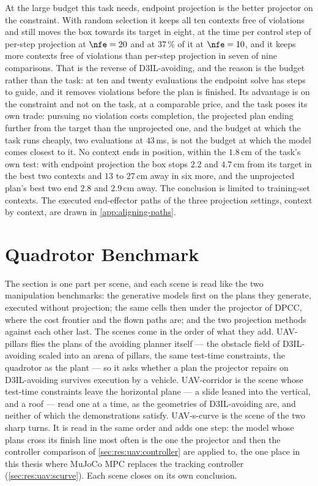 At the large budget this task needs, endpoint projection is the better projector on the constraint. With
random selection it keeps all ten contexts free of violations and still moves the box towards its target in
eight, at the time per control step of per-step projection at $\nfe=20$ and at $37\,\%$ of it at $\nfe=10$, and
it keeps more contexts free of violations than per-step projection in seven of nine comparisons. That is the reverse of D3IL-avoiding,
and the reason is the budget rather than the task: at ten and twenty evaluations the endpoint solve has steps
to guide, and it removes violations before the plan is finished. Its advantage is on the constraint and not on
the task, at a comparable price, and the task poses its own trade: pursuing no violation costs completion, the
projected plan ending further from the target than the unprojected one, and the budget at which the task runs
cheaply, two evaluations at $43$\,ms, is not the budget at which the model comes closest to it. No context ends
in position, within the $1.8$\,cm of the task's own test: with endpoint projection the box stops $2.2$ and
$4.7$\,cm from its target in the best two contexts and $13$ to $27$\,cm away in six more, and the unprojected plan's
best two end $2.8$ and $2.9$\,cm away. The conclusion is limited to training-set contexts. The executed end-effector paths of the three projection settings, context by
context, are drawn in \autoref{app:aligning-paths}.

\section{Quadrotor Benchmark}\label{sec:res:uav}

The section is one part per scene, and each scene is read like the two manipulation benchmarks: the
generative models first on the plans they generate, executed without projection; the same cells then under
the projector of \ac{DPCC}, where the cost frontier and the flown paths are; and the two projection methods
against each other last. The scenes come in the order of what they add. UAV-pillars flies the plans of the avoiding planner itself
--- the obstacle field of D3IL-avoiding scaled into an arena of pillars, the same test-time constraints, the
quadrotor as the plant --- so it asks whether a plan the projector repairs on D3IL-avoiding survives execution
by a vehicle. UAV-corridor is the scene whose test-time constraints leave the horizontal plane --- a slide leaned into
the vertical, and a roof --- read one at a time, as the geometries of D3IL-avoiding are, and neither of
which the demonstrations satisfy.
UAV-s-curve is the scene of the two sharp turns. It is read in the same order and adds one step: the model
whose plans cross its finish line most often is the one the projector and then the controller comparison
of \autoref{sec:res:uav:controller} are applied to, the one place in this thesis where MuJoCo MPC replaces
the tracking controller (\autoref{sec:res:uav:scurve}). Each scene closes on its own conclusion.

